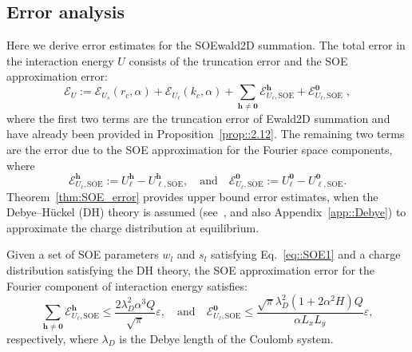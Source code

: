\subsection{Error analysis}\label{subsec::errSOEwald2D}
Here we derive error estimates for the SOEwald2D summation. 
The total error in the interaction energy $U$ consists of the truncation error and the SOE approximation error:
\begin{equation}
	\mathscr{E}_{U} := \mathscr{E}_{U_{s}}(r_c, \alpha) + \mathscr{E}_{U_{\ell}}(k_c, \alpha) + \sum_{\bm{h}\neq\bm{0}}\mathscr{E}_{U_{\ell},\text{SOE}}^{ \bm{h}} + \mathscr{E}_{U_{\ell},\text{SOE}}^{\bm{0}}\;,
\end{equation}
where the first two terms are the truncation error of Ewald2D summation and have already been provided in Proposition~\ref{prop::2.12}. 
The remaining two terms are the error due to the SOE approximation for the Fourier space components, where
\begin{equation}
	\mathscr{E}_{U_{\ell},\text{SOE}}^{\bm{h}}:=U_{\ell}^{\bm{h}}-U_{\ell,\text{SOE}}^{\bm{h}},\quad \text{and}\quad \mathscr{E}_{U_{\ell},\text{SOE}}^{\bm{0}}:=U_{\ell}^{\bm{0}}- U_{\ell,\text{SOE}}^{\bm{0}}.
\end{equation}
Theorem~\ref{thm:SOE_error} provides upper bound error estimates, when the Debye--H\"uckel (DH) theory is assumed (see~\cite{levin2002electrostatic}, and also Appendix~\ref{app::Debye}) to approximate the charge distribution at equilibrium.

\begin{thm}
	\label{thm:SOE_error}
	Given a set of SOE parameters $w_l$ and $s_l$ satisfying Eq.~\eqref{eq::SOE1} and a charge distribution satisfying the DH theory, the SOE approximation error for the Fourier component of interaction energy satisfies:
	\begin{equation}\sum_{\bm{h}\neq\bm{0}}\mathscr{E}_{U_{\ell},\text{SOE}}^{\bm{h}} \leq \frac{2 \lambda_D^2 \alpha^3Q}{\sqrt{\pi}}\varepsilon,
		\quad \text{and} \quad
		\mathscr{E}_{U_{\ell},\text{SOE}}^{\bm{0}} \leq \frac{\sqrt{\pi} \lambda_D^2 (1+2\alpha^2H)Q}{\alpha L_xL_y}\varepsilon,
		\label{eq::51}
	\end{equation}
	respectively, where $\lambda_D$ is the Debye length of the Coulomb system. 
\end{thm}

